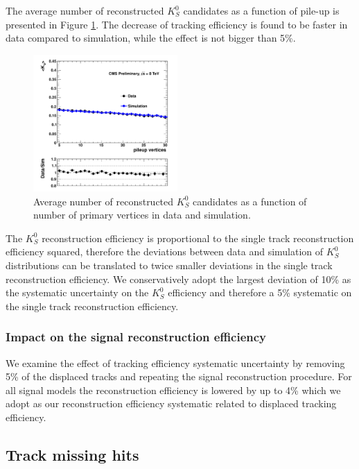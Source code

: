 The average number of 
reconstructed $K^0_S$ candidates as a function of pile-up is presented in Figure \ref{fig:kspileup}. 
The decrease of tracking efficiency is found to be faster in data compared to simulation, while the 
effect is not bigger than 5\%.

\begin{figure}[htbp]
\centering
\includegraphics[width=0.49\textwidth]{plots/kshort/effnPV.pdf}
\caption{Average number of reconstructed $K^0_S$ candidates as a function of number of primary vertices in data and simulation. \label{fig:kspileup}}
\end{figure}

The $K^0_S$ reconstruction efficiency is proportional to the single track reconstruction efficiency squared, 
therefore the deviations between data and simulation of $K^0_S$ distributions can be translated to twice smaller 
deviations in the single track reconstruction efficiency. We conservatively adopt the largest deviation 
of 10\% as the systematic uncertainty on the $K^0_S$ efficiency and therefore a 5\% systematic on the 
single track reconstruction efficiency. 

\subsubsection{Impact on the signal reconstruction efficiency}

We examine the effect of tracking efficiency systematic uncertainty by removing 5\% of the displaced tracks 
 and repeating the signal reconstruction procedure.
For all signal models the reconstruction efficiency is lowered by up to 4\% which we adopt as our reconstruction
efficiency systematic related to displaced tracking efficiency.  

\subsection{Track missing hits}

